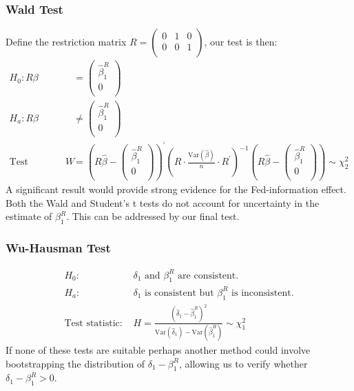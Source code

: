 \documentclass[a4paper,man,floatsintext,natbib]{apa6}
\begin{document}
	\subsubsection{Wald Test}
	Define the restriction matrix \(R =\begin{pmatrix}
		0 &1  &0\\
		0 &0  &1\\
	\end{pmatrix}\), our test is then:
	\begin{align*}
		H_0: R\beta &=\begin{pmatrix}
			\hat{\beta}^R_1 \\
			0 \\
		\end{pmatrix} \\
		H_a:  R\beta &\neq\begin{pmatrix}
			\hat{\beta}^R_1 \\
			0 \\
		\end{pmatrix}\\
		\text{Test statistic: } W &= \left(R\hat{\beta} - \begin{pmatrix}
			\hat{\beta}^R_1 \\
			0 \\
		\end{pmatrix}\right)^\prime\left(R\cdot \frac{\mathrm{Var}(\hat{\beta})}{n}\cdot R^\prime \right)^{-1}\left(R\hat{\beta} - \begin{pmatrix}
			\hat{\beta}^R_1 \\
			0 \\
		\end{pmatrix}\right) \sim \chi^2_2
	\end{align*}
	A significant result would provide strong evidence for the Fed-information effect. Both the Wald and Student's t tests do not account for uncertainty in the estimate of \(\beta_1^R\). This can be addressed by our final test.
	\subsubsection{Wu-Hausman Test}
	\begin{align*}
		H_0: &\delta_1 \text{ and } \beta_1^R \text{ are consistent.} \\
		H_a: &\delta_1 \text{ is consistent but } \beta_1^R \text{ is inconsistent.} \\
		\text{Test statistic: } &H = \frac{(\hat{\delta}_1-\hat{\beta}_1^R)^2}{\mathrm{Var}(\hat{\delta}_1)-\mathrm{Var}(\hat{\beta}_1^R)} \sim \chi^2_1
	\end{align*}
	If none of these tests are suitable perhaps another method could involve bootstrapping the distribution of \(\delta_1 - \beta_1^R\), allowing us to verify whether \(\delta_1 - \beta_1^R > 0\).
\end{document}

